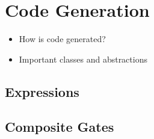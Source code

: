 \section{Code Generation}
\begin{itemize}
    \item How is code generated?
    \item Important classes and abstractions
\end{itemize}


\subsection{Expressions}

\subsection{Composite Gates}